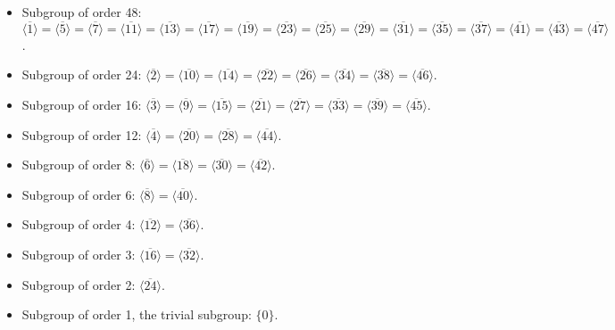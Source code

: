 \documentclass{article}
\begin{document}
\begin{itemize}[itemsep=0em]
    \item Subgroup of order 48: $\langle \overline{1} \rangle = \langle \overline{5} \rangle = \langle \overline{7} \rangle = \langle \overline{11} \rangle = \langle \overline{13} \rangle = \langle \overline{17} \rangle = \langle \overline{19} \rangle = \langle \overline{23} \rangle = \langle \overline{25} \rangle = \langle \overline{29} \rangle = \langle \overline{31} \rangle = \langle \overline{35} \rangle = \langle \overline{37} \rangle = \langle \overline{41} \rangle = \langle \overline{43} \rangle = \langle \overline{47} \rangle$.

    \item Subgroup of order 24: $\langle \overline{2} \rangle = \langle \overline{10} \rangle = \langle \overline{14} \rangle = \langle \overline{22} \rangle = \langle \overline{26} \rangle = \langle \overline{34} \rangle = \langle \overline{38} \rangle = \langle \overline{46} \rangle$.

    \item Subgroup of order 16: $\langle \overline{3} \rangle = \langle \overline{9} \rangle = \langle \overline{15} \rangle = \langle \overline{21} \rangle = \langle \overline{27} \rangle = \langle \overline{33} \rangle = \langle \overline{39} \rangle = \langle \overline{45} \rangle$.

    \item Subgroup of order 12: $\langle \overline{4} \rangle = \langle \overline{20} \rangle = \langle \overline{28} \rangle = \langle \overline{44} \rangle$.

    \item Subgroup of order 8: $\langle \overline{6} \rangle = \langle \overline{18} \rangle = \langle \overline{30} \rangle = \langle \overline{42} \rangle$.

    \item Subgroup of order 6: $\langle \overline{8} \rangle = \langle \overline{40} \rangle$.

    \item Subgroup of order 4: $\langle \overline{12} \rangle = \langle \overline{36} \rangle$.

    \item Subgroup of order 3: $\langle \overline{16} \rangle = \langle \overline{32} \rangle$.

    \item Subgroup of order 2: $\langle \overline{24} \rangle$.

    \item Subgroup of order 1, the trivial subgroup: $\{ 0 \}$.
\end{itemize}
\end{document}
